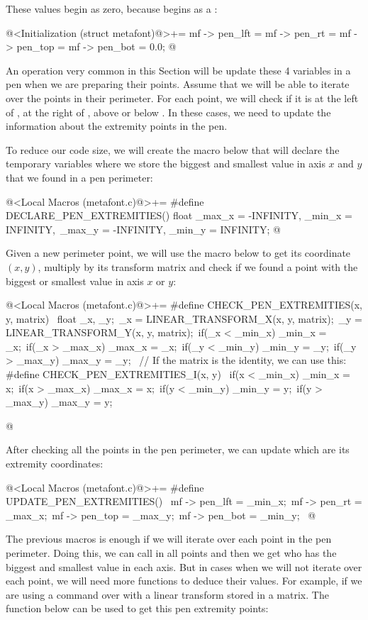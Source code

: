 {{{{{These values begin as zero, because  begins as
a :

\iniciocodigo
@<Initialization (struct metafont)@>+=
mf -> pen_lft = mf -> pen_rt = mf -> pen_top = mf -> pen_bot = 0.0;
@
\fimcodigo

An operation very common in this Section will be update these 4
variables in a pen when we are preparing their points. Assume that we
will be able to iterate over the points in their perimeter. For each
point, we will check if it is at the left of , at
the right of , above  or
below . In these cases, we need to update the
information about the extremity points in the pen.

To reduce our code size, we will create the macro below that will
declare the temporary variables where we store the biggest and
smallest value in axis $x$ and $y$ that we found in a pen perimeter:

\iniciocodigo
@<Local Macros (metafont.c)@>+=
#define DECLARE_PEN_EXTREMITIES() float _max_x = -INFINITY, _min_x = INFINITY,\
                                  _max_y = -INFINITY, _min_y = INFINITY;
@
\fimcodigo

Given a new perimeter point, we will use the macro below to get its
coordinate $(x, y)$, multiply by its transform matrix and check if we
found a point with the biggest or smallest value in axis $x$ or $y$:

\iniciocodigo
@<Local Macros (metafont.c)@>+=
#define CHECK_PEN_EXTREMITIES(x, y, matrix) {\
   float _x, _y;\
   _x = LINEAR_TRANSFORM_X(x, y, matrix);\
   _y = LINEAR_TRANSFORM_Y(x, y, matrix);\
   if(_x < _min_x) _min_x = _x;\
   if(_x > _max_x) _max_x = _x;\
   if(_y < _min_y) _min_y = _y;\
   if(_y > _max_y) _max_y = _y;\
  }
// If the matrix is the identity, we can use this:
#define CHECK_PEN_EXTREMITIES_I(x, y) {\
   if(x < _min_x) _min_x = x;\
   if(x > _max_x) _max_x = x;\
   if(y < _min_y) _min_y = y;\
   if(y > _max_y) _max_y = y;\
  }

@
\fimcodigo

After checking all the points in the pen perimeter, we can update
which are its extremity coordinates:

\iniciocodigo
@<Local Macros (metafont.c)@>+=
#define UPDATE_PEN_EXTREMITIES() {\
  mf -> pen_lft = _min_x;\
  mf -> pen_rt = _max_x;\
  mf -> pen_top = _max_y;\
  mf -> pen_bot = _min_y;\
}
@
\fimcodigo

The previous macros is enough if we will iterate over each point in
the pen perimeter. Doing this, we can
call  in all points and then we
get who has the biggest and smallest value in each axis. But in cases
when we will not iterate over each point, we will need more functions
to deduce their values. For example, if we are using
a \monoespaco{pickup} command over  with a
linear transform stored in a matrix. The function below can be used to
get this pen extremity points:

}}}}}
